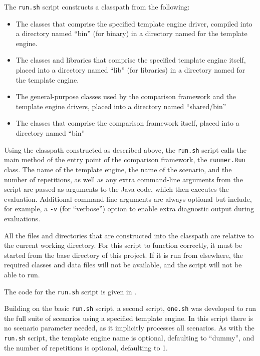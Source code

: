 The \texttt{run.sh} script constructs a \gls{classpath} from the following:

\begin{itemize}
    \item The classes that comprise the specified \gls{template engine} driver, compiled into a directory named \enquote{bin} (for binary) in a directory named for the \gls{template engine}.
    \item The classes and libraries that comprise the specified \gls{template engine} itself, placed into a directory named \enquote{lib} (for libraries) in a directory named for the \gls{template engine}.
    \item The general-purpose classes used by the comparison framework and the \gls{template engine} drivers, placed into a directory named \enquote{shared/bin}
    \item The classes that comprise the comparison framework itself, placed into a directory named \enquote{bin}
\end{itemize}

Using the \gls{classpath} constructed as described above, the \texttt{run.sh} script calls the main method of the entry point of the comparison framework, the \verb!runner.Run! class. The name of the \gls{template engine}, the name of the scenario, and the number of repetitions, as well as any extra command-line arguments from the script are passed as arguments to the Java code, which then executes the evaluation. Additional command-line arguments are always optional but include, for example, a \verb!-v! (for \enquote{verbose}) option to enable extra diagnostic output during evaluations.

All the files and directories that are constructed into the \gls{classpath} are relative to the current working directory. For this script to function correctly, it must be started from the base directory of this project. If it is run from elsewhere, the required classes and data files will not be available, and the script will not be able to run.

The code for the \texttt{run.sh} script is given in .

Building on the basic \texttt{run.sh} script, a second script, \texttt{one.sh} was developed to run the full suite of scenarios using a specified \gls{template engine}. In this script there is no scenario parameter needed, as it implicitly processes all scenarios. As with the \texttt{run.sh} script, the \gls{template engine} name is optional, defaulting to \enquote{dummy}, and the number of repetitions is optional, defaulting to 1. 

